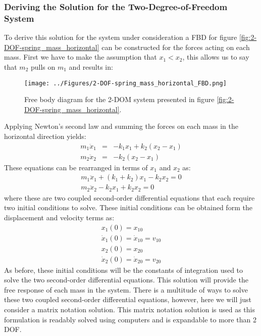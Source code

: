 \documentclass[12pt,letter]{article}
\numberwithin{ex}{section} %
\numberwithin{re}{section} %
\begin{document}
\subsubsection{Deriving the Solution for the Two-Degree-of-Freedom System}
\label{sec:2-DOF_derive_solution}
To derive this solution for the system under consideration a FBD for figure \ref{fig:2-DOF-spring_mass_horizontal} can be constructed for the forces acting on each mass. First we have to make the assumption that $x_1 < x_2$, this allows us to say that $m_2$ pulls on $m_1$ and results in:
\begin{figure}[H]
	\centering
	\texttt{[image: ../Figures/2-DOF-spring\_mass\_horizontal\_FBD.png]}
	\caption{Free body diagram for the 2-DOM system presented in figure \ref{fig:2-DOF-spring_mass_horizontal}.}
	\label{fig:2-DOF-spring_mass_horizontal_FBD}
\end{figure}
\noindent Applying Newton's second law and summing the forces on each mass in the horizontal direction yields:
\begin{eqnarray}
m_1\ddot{x}_1 &= & -k_1x_1 + k_2(x_2-x_1) \\
m_2\ddot{x}_2&= & -k_2(x_2-x_1)  \nonumber
\end{eqnarray}
These equations can be rearranged in terms of  $x_1$ and $x_2$ as:
\begin{eqnarray}
m_1\ddot{x}_1 +(k_1+k_2)x_1 -k_2x_2 =0 \\
m_2\ddot{x}_2 - k_2x_1 + k_2x_2 = 0 \nonumber
\end{eqnarray}
where these are two coupled second-order differential equations that each require two initial conditions to solve. These initial conditions can be obtained form the displacement and velocity terms as:
\begin{eqnarray}
x_1(0) = x_{10} \\
\dot{x}_1(0) = \dot{x}_{10} = v_{10} \nonumber \\ 
x_2(0) = x_{20} \nonumber \\ 
\dot{x}_2(0) = \dot{x}_{20} = v_{20} \nonumber
\end{eqnarray}
As before, these initial conditions will be the constants of integration used to solve the two second-order differential equations. This solution will provide the free response of each mass in the system. There is a multitude of ways to solve these two coupled  second-order differential equations, however, here we will just consider a matrix notation solution. This matrix notation solution is used as this formulation is readably solved using computers and is expandable to more than 2 DOF.
\end{document}

